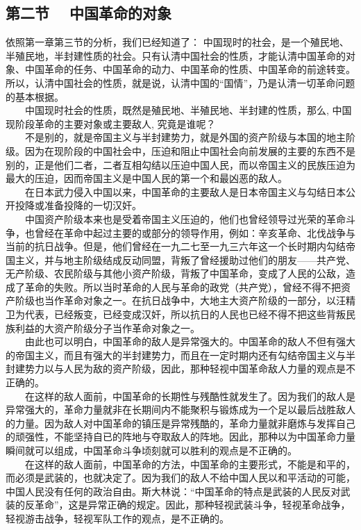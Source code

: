 \documentclass[cn,11pt,chinese]{elegantbook}
\def\myformat#1{\hfil\hfil #1}
\begin{document}
\subsection*{\myformat{第二节　 中国革命的对象}}
依照第一章第三节的分析，我们已经知道了： 中国现时的社会，是一个殖民地、半殖民地，半封建性质的社会。只有认清中国社会的性质，才能认清中国革命的对象、中国革命的任务、中国革命的动力、中国革命的性质、中国革命的前途转变。所以，认清中国社会的性质，就是说，认清中国的“国情”，乃是认清一切革命问题的基本根据。\\
　　中国现时社会的性质，既然是殖民地、半殖民地、半封建的性质，那么, 中国现阶段革命的主要对象或主要敌人, 究竟是谁呢？\\
　　不是别的，就是帝国主义与半封建势力，就是外国的资产阶级与本国的地主阶级。因为在现阶段的中国社会中，压迫和阻止中国社会向前发展的主要的东西不是别的，正是他们二者，二者互相勾结以压迫中国人民，而以帝国主义的民族压迫为最大的压迫，因而帝国主义是中国人民的第一个和最凶恶的敌人。\\
　　在日本武力侵入中国以来，中国革命的主要敌人是日本帝国主义与勾结日本公开投降或准备投降的一切汉奸。\\
　　中国资产阶级本来也是受着帝国主义压迫的，他们也曾经领导过光荣的革命斗争，也曾经在革命中起过主要的或部分的领导作用，例如：辛亥革命、北伐战争与当前的抗日战争。但是，他们曾经在一九二七至一九三六年这一个长时期内勾结帝国主义，并与地主阶级结成反动同盟，背叛了曾经援助过他们的朋友——共产党、无产阶级、农民阶级与其他小资产阶级，背叛了中国革命，变成了人民的公敌，造成了革命的失败。所以当时革命的人民与革命的政党（共产党），曾经不得不把资产阶级也当作革命对象之一。在抗日战争中，大地主大资产阶级的一部分，以汪精卫为代表，已经叛变，已经变成汉奸，所以抗日的人民也已经不得不把这些背叛民族利益的大资产阶级分子当作革命对象之一。\\
　　由此也可以明白，中国革命的敌人是异常强大的。中国革命的敌人不但有强大的帝国主义，而且有强大的半封建势力，而且在一定时期内还有勾结帝国主义与半封建势力以与人民为敌的资产阶级，因此，那种轻视中国革命敌人力量的观点是不正确的。\\
　　在这样的敌人面前，中国革命的长期性与残酷性就发生了。因为我们的敌人是异常强大的，革命力量就非在长期间内不能聚积与锻炼成为一个足以最后战胜敌人的力量。因为敌人对中国革命的镇压是异常残酷的，革命力量就非磨炼与发挥自己的顽强性，不能坚持自已的阵地与夺取敌人的阵地。因此，那种以为中国革命力量瞬间就可以组成，中国革命斗争顷刻就可以胜利的观点是不正确的。\\
　　在这样的敌人面前，中国革命的方法，中国革命的主要形式，不能是和平的，而必须是武装的，也就决定了。因为我们的敌人不给中国人民以和平活动的可能，中国人民没有任何的政治自由。斯大林说：“中国革命的特点是武装的人民反对武装的反革命”，这是异常正确的规定。因此，那种轻视武装斗争，轻视革命战争，轻视游击战争，轻视军队工作的观点，是不正确的。\\
\end{document}

